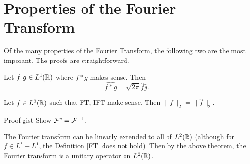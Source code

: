 \section{Properties of the Fourier Transform}
Of the many properties of the Fourier Transform, the following two are the most imporant. The proofs are straightforward.
\begin{thm}
    Let $f,g \in L^1({\mathbb R})$ where $f * g$ makes sense. Then
    \[
        \widehat{f * g} = \sqrt{2\pi} \hat{f} \hat{g}.
    \]
\end{thm}
\begin{thm}
    Let $f \in L^2({\mathbb R})$ such that FT, IFT make sense. Then $\|f\|_2 = \|\hat{f}\|_2$.
\end{thm}
\begin{details}{Proof gist}
    Show ${\mathcal F}^* = {\mathcal F}^{-1}$.
\end{details}
\begin{remark}
    The Fourier transform can be linearly extended to all of $L^2({\mathbb R})$ (although for $f \in L^2-L^1$, the Definition \ref{FT} does not hold). Then by the above theorem, the Fourier transform is a unitary operator on $L^2({\mathbb R})$.
\end{remark}

